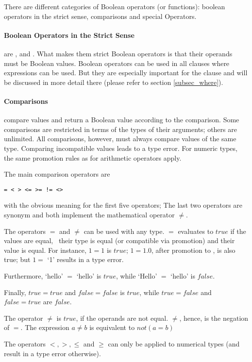 There are different categories of Boolean
operators (or functions):
boolean operators in the strict sense,
comparisons and special Operators.

\paragraph{Boolean Operators in the Strict Sense}
are ,  and .
What makes them strict Boolean operators is
that their operands must be Boolean values.
Boolean operators can be used in all clauses
where expressions can be used.
But they are especially important for the
 clause and will be discussed
in more detail there (please refer to section
\ref{subsec_where}).

\paragraph{Comparisons}
compare values and return
a Boolean value according to the comparison.
Some comparisons are restricted in terms
of the types of their arguments;
others are unlimited. All comparisons, however,
must always compare values of the same type.
Comparing incompatible values leads to a type error.
For numeric types, the same promotion rules
as for arithmetic operators apply.

The main comparison operators are
\begin{verbatim}
= < > <= >= != <>
\end{verbatim}
with the obvious meaning for
the first five operators;
The last two operators
are synonym and both implement
the mathematical operator $\neq$.

The operators $=$ and $\neq$ can be used
with any type. $=$ evaluates to $true$
if the values are equal, \ie\
their type is equal (or compatible
via promotion) and their value
is equal. For instance,
$1 = 1$ is $true$;
$1 = 1.0$, after promotion to ,
is also true; but
$1 =$ `1' results in a type error.

Furthermore, `hello' $=$ `hello'
is $true$, while `Hello' $=$ `hello'
is $false$.

Finally, $true = true$ and
$false = false$ is $true$, while
$true = false$ and $false = true$ are
$false$.

The operator $\neq$ is $true$,
if the operands are not equal.
$\neq$, hence, is the negation
of $=$. The expression $a\neq b$ is equivalent to
$not (a=b)$

The  operators
$<,>,\le$ and $\ge$ can only be applied
to numerical types (and result in a
type error otherwise).

